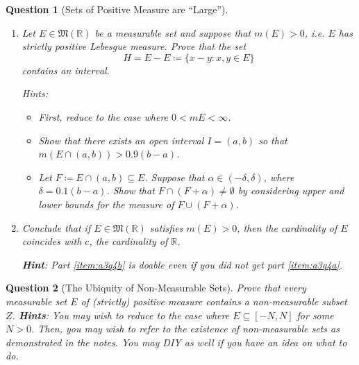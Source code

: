 \documentclass[notoc,notitlepage]{tufte-book}
\newtheorem{assgprob}{Question}[section]
\begin{document}
\begin{assgprob}[Sets of Positive Measure are ``Large'']
  \begin{enumerate}
    \item \label{item:a3q4a}
      Let $E \in \mathfrak{M}(\mathbb{R})$ be a measurable set and
      suppose that $m(E) > 0$, i.e. $E$ has strictly positive Lebesgue measure.
      Prove that the set
      \begin{equation*}
        H = E - E \coloneqq \{ x - y : x, y \in E \}
      \end{equation*}
      contains an interval.

      Hints:
      \begin{itemize}
        \item First, reduce to the case where $0 < mE < \infty$.
        \item Show that there exists an open interval $I = (a, b)$
          so that $m(E \cap (a, b)) > 0.9(b - a)$.
        \item Let $F \coloneqq E \cap (a, b) \subseteq E$.
          Suppose that $\alpha \in (-\delta, \delta)$,
          where $\delta = 0.1(b - a)$.
          Show that $F \cap (F + \alpha) \neq \emptyset$ by considering
          upper and lower bounds for the measure of $F \cup (F + \alpha)$.
      \end{itemize}

    \item \label{item:a3q4b}
      Conclude that if $E \in \mathfrak{M}(\mathbb{R})$
      satisfies $m(E) > 0$, then
      the cardinality of $E$ coincides with $c$,
      the cardinality of $\mathbb{R}$.

      \textbf{Hint}: Part \ref{item:a3q4b} is doable even if you did not get
      part \ref{item:a3q4a}.
  \end{enumerate}
\end{assgprob}

\begin{assgprob}[The Ubiquity of Non-Measurable Sets]
  Prove that every measurable set $E$ of (strictly) positive measure
  contains a non-measurable subset $Z$. \linebreak
  \textbf{Hints}: You may wish to reduce to the case where $E \subseteq [-N, N]$
  for some $N > 0$.
  Then, you may wish to refer to the existence of non-measurable sets
  as demonstrated in the notes.
  You may DIY as well if you have an idea on what to do.
\end{assgprob}
\end{document}

